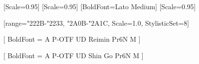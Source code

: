 

\usepackage[no-math,deluxe,expert]{luatexja-preset}

\setmainfont{IBM Plex Serif}[Scale=0.95]
[Scale=0.95]
\setsansfont{Lato}[BoldFont={Lato Medium}]
\setmonofont{IBM Plex Mono}[Scale=0.95]

[range={"222B-"2233, "2A0B-"2A1C}, Scale=1.0, StylisticSet=8]



[
  BoldFont = {A P-OTF UD Reimin Pr6N M}
]

[
  BoldFont = {A P-OTF UD Shin Go Pr6N M}
]

